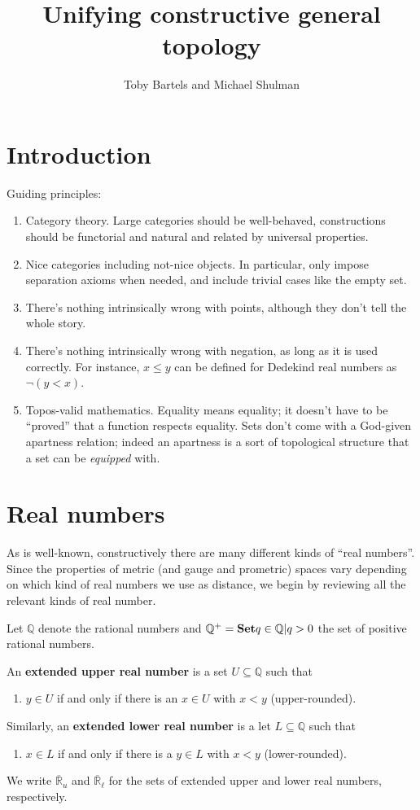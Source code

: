 \documentclass{article}
\title{Unifying constructive general topology}
\author{Toby Bartels and Michael Shulman}
\def\Q{\mathbb{Q}}
\def\Qp{\mathbb{Q}^+}
\def\R{\mathbb{R}}
\def\Re{\overline{\R}}
\def\Reu{\Re_u}
\def\Rel{\Re_{\ell}}
\begin{document}
\maketitle

\section{Introduction}
\label{sec:intro}

Guiding principles:
\begin{enumerate}
\item Category theory.  Large categories should be well-behaved, constructions should be functorial and natural and related by universal properties.
\item Nice categories including not-nice objects.  In particular, only impose separation axioms when needed, and include trivial cases like the empty set.
\item There's nothing intrinsically wrong with points, although they don't tell the whole story.
\item There's nothing intrinsically wrong with negation, as long as it is used correctly.
  For instance, $x\le y$ can be defined for Dedekind real numbers as $\neg(y<x)$.
\item Topos-valid mathematics.  Equality means equality; it doesn't have to be ``proved'' that a function respects equality.  Sets don't come with a God-given apartness relation; indeed an apartness is a sort of topological structure that a set can be \emph{equipped} with.
\end{enumerate}

\section{Real numbers}
\label{sec:reals}

As is well-known, constructively there are many different kinds of ``real numbers''.
Since the properties of metric (and gauge and prometric) spaces vary depending on which kind of real numbers we use as distance, we begin by reviewing all the relevant kinds of real number.

Let $\Q$ denote the rational numbers and $\Qp = \setof{ q\in \Q | q>0}$ the set of positive rational numbers.

\begin{defn}
  An \textbf{extended upper real number} is a set $U\subseteq \Q$ such that
  \begin{enumerate}
  \item $y\in U$ if and only if there is an $x\in U$ with $x<y$ (upper-rounded).
  \end{enumerate}
  Similarly, an \textbf{extended lower real number} is a let $L\subseteq \Q$ such that
  \begin{enumerate}
  \item $x\in L$ if and only if there is a $y\in L$ with $x<y$ (lower-rounded).
  \end{enumerate}
  We write $\Reu$ and $\Rel$ for the sets of extended upper and lower real numbers, respectively.
\end{defn}
\end{document}
